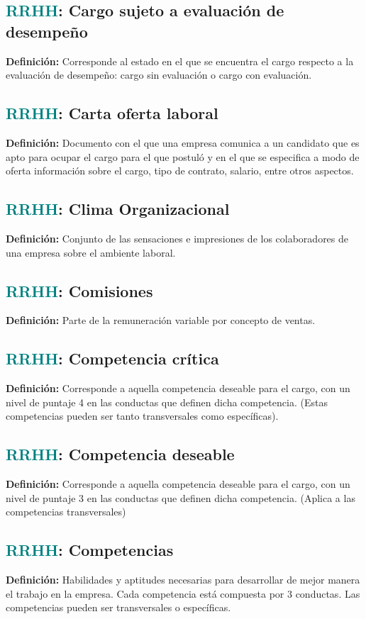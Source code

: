 \documentclass[12pt]{article}
\begin{document}
\subsection{\textcolor{teal}{RRHH}: Cargo sujeto a evaluación de desempeño}
\textbf{Definición:} Corresponde al estado en el que se encuentra el cargo respecto a la evaluación de desempeño: cargo sin evaluación o cargo con evaluación.
\subsection{\textcolor{teal}{RRHH}: Carta oferta laboral}
\textbf{Definición:} Documento con el que una empresa comunica a un candidato que es apto para ocupar el cargo para el que postuló y en el que se especifica a modo de oferta información sobre el cargo, tipo de contrato, salario, entre otros aspectos.
\subsection{\textcolor{teal}{RRHH}: Clima Organizacional}
\textbf{Definición:} Conjunto de las sensaciones e impresiones de los colaboradores de una empresa sobre el ambiente laboral.
\subsection{\textcolor{teal}{RRHH}: Comisiones}
\textbf{Definición:} Parte de la remuneración variable por concepto de ventas.
\subsection{\textcolor{teal}{RRHH}: Competencia crítica}
\textbf{Definición:} Corresponde a aquella competencia deseable para el cargo, con un nivel de puntaje 4 en las conductas que definen dicha competencia. (Estas competencias pueden ser tanto transversales como específicas).
\subsection{\textcolor{teal}{RRHH}: Competencia deseable}
\textbf{Definición:} Corresponde a aquella competencia deseable para el cargo, con un nivel de puntaje 3 en las conductas que definen dicha competencia. (Aplica a las competencias transversales)
\subsection{\textcolor{teal}{RRHH}: Competencias}
\textbf{Definición:} Habilidades y aptitudes necesarias para desarrollar de mejor manera el trabajo en la empresa. Cada competencia está compuesta por 3 conductas. Las competencias pueden ser transversales o específicas.
\end{document}
